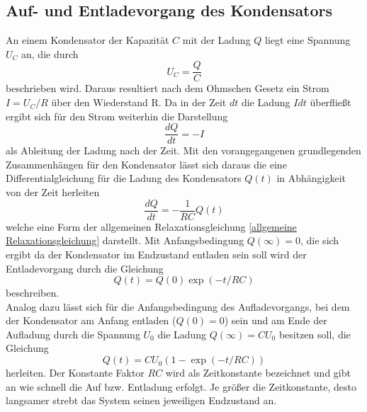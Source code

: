 \subsection{Auf- und Entladevorgang des Kondensators}
An einem Kondensator der Kapazität $C$ mit der Ladung $Q$ liegt eine Spannung $U_C$ an, die durch
\begin{equation*}
U_C=\frac{Q}{C}
\end{equation*}
beschrieben wird. Daraus resultiert nach dem Ohmschen Gesetz ein Strom $I=U_C/R$ über den Wiederstand R. Da in der Zeit $dt$ die Ladung 
$Idt$ überfließt ergibt sich für den Strom weiterhin die Darstellung
\begin{equation*}
\frac{dQ}{dt}=-I
\end{equation*}
als Ableitung der Ladung nach der Zeit. Mit den vorangegangenen grundlegenden Zusammenhängen für den Kondensator lässt sich daraus die 
eine Differentialgleichung für die Ladung des Kondensators $Q(t)$ in Abhängigkeit von der Zeit herleiten
\begin{equation}
\frac{dQ}{dt}=-\frac{1}{RC}Q(t)
\end{equation}
welche eine Form der allgemeinen Relaxationsgleichung \ref{allgemeine Relaxationsgleichung} darstellt. Mit Anfangsbedingung $Q(\infty)=0$, die sich ergibt da der 
Kondensator im Endzustand entladen sein soll wird der Entladevorgang durch die Gleichung
\begin{equation}
Q(t)=Q(0)\exp (-t/RC)
\end{equation}
beschreiben. \\
Analog dazu lässt sich für die Anfangsbedingung des Aufladevorgangs, bei dem der Kondensator am Anfang entladen ($Q(0)=0$) sein und am Ende der Aufladung durch die
Spannung $U_0$ die Ladung $Q(\infty)=CU_0$ besitzen soll, die Gleichung 
\begin{equation}
Q(t)=CU_0(1-\exp(-t/RC))
\end{equation}
herleiten. Der Konstante Faktor $RC$ wird als Zeitkonstante bezeichnet und gibt an wie schnell die Auf bzw. Entladung erfolgt. Je größer die Zeitkonstante,
desto langsamer strebt das System seinen jeweiligen Endzustand an.
